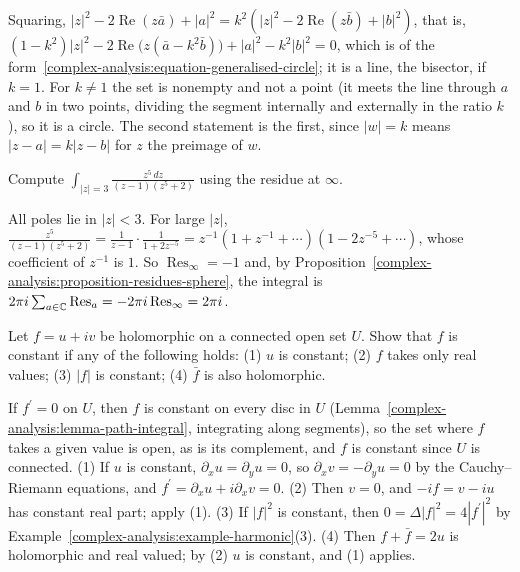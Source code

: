 \begin{solution}
Squaring, $|z|^2 - 2\operatorname{Re}(z\bar a) + |a|^2 = k^2(|z|^2 - 2\operatorname{Re}(z\bar b) + |b|^2)$, that is,
$(1 - k^2)|z|^2 - 2\operatorname{Re}\bigl(z(\bar a - k^2\bar b)\bigr) + |a|^2 - k^2|b|^2 = 0$, which is of the form~\eqref{complex-analysis:equation-generalised-circle}; it is a line, the bisector, if $k = 1$. For $k \neq 1$ the
set is nonempty and not a point (it meets the line through $a$ and $b$ in two points, dividing the segment internally and externally in the ratio $k$), so it is a circle. The second statement is the first, since
$|w| = k$ means $|z - a| = k|z - b|$ for $z$ the preimage of $w$.
\end{solution}

\begin{exercise}\label{complex-analysis:exercise-residue-infinity}
Compute $\int_{|z| = 3}\frac{z^{5}\,dz}{(z - 1)(z^5 + 2)}$ using the residue at $\infty$.
\end{exercise}

\begin{solution}
All poles lie in $|z| < 3$. For large $|z|$, $\frac{z^5}{(z - 1)(z^5 + 2)} = \frac{1}{z - 1}\cdot\frac{1}{1 + 2z^{-5}} = z^{-1}(1 + z^{-1} + \cdots)(1 - 2z^{-5} + \cdots)$, whose coefficient of $z^{-1}$ is $1$. So
$\operatorname{Res}_\infty = -1$ and, by Proposition~\ref{complex-analysis:proposition-residues-sphere}, the integral is $2\pi i\sum_{a \in \mathbb{C}}\operatorname{Res}_a = -2\pi i\operatorname{Res}_\infty = 2\pi i$.
\end{solution}

\begin{exercise}\label{complex-analysis:exercise-constant-modulus}
Let $f = u + iv$ be holomorphic on a connected open set $U$. Show that $f$ is constant if any of the following holds: (1) $u$ is constant; (2) $f$ takes only real values; (3) $|f|$ is constant; (4) $\bar f$ is
also holomorphic.
\end{exercise}

\begin{solution}
If $f^{\prime} = 0$ on $U$, then $f$ is constant on every disc in $U$ (Lemma~\ref{complex-analysis:lemma-path-integral}, integrating along segments), so the set where $f$ takes a given value is open, as is its
complement, and $f$ is constant since $U$ is connected. (1) If $u$ is constant, $\partial_xu = \partial_yu = 0$, so $\partial_xv = -\partial_yu = 0$ by the Cauchy--Riemann equations, and
$f^{\prime} = \partial_xu + i\partial_xv = 0$. (2) Then $v = 0$, and $-if = v - iu$ has constant real part; apply (1). (3) If $|f|^2$ is constant, then $0 = \Delta|f|^2 = 4|f^{\prime}|^2$ by
Example~\ref{complex-analysis:example-harmonic}(3). (4) Then $f + \bar f = 2u$ is holomorphic and real valued; by (2) $u$ is constant, and (1) applies.
\end{solution}

